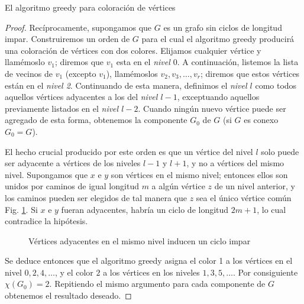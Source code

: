 \begin{section}{El algoritmo greedy para coloración de vértices}
\begin{proof}
Recíprocamente, supongamos que $G$ es un grafo sin ciclos de longitud impar. Construiremos un orden de $G$ para el cual el algoritmo greedy producirá una coloración de vértices con dos colores. Elijamos cualquier vértice y llamémoslo $v_1$; diremos que $v_1$ esta en el \textit{nivel $0$}. A continuación, listemos la
lista de vecinos de $v_1$ (excepto $v_1$), llamémoslos $v_2,v_3,\dots,v_r$; diremos que estos vértices están en el \textit{nivel 2}. Continuando de esta manera, definimos el \textit{nivel $l$} como todos aquellos vértices adyacentes a los del \textit{nivel $l-1$}, exceptuando aquellos previamente listados en el \textit{nivel
$l-2$}. Cuando ningún nuevo vértice puede ser agregado de esta forma, obtenemos la componente $G_0$ de $G$ (si $G$ es conexo $G_0=G$).

El hecho crucial producido por este orden es que un vértice del nivel $l$ solo puede ser adyacente a vértices de los niveles $l-1$ y $l+1$, y no a vértices del mismo nivel. Supongamos que $x$ e $y$ son vértices en el mismo nivel; entonces ellos son unidos por caminos de igual longitud $m$ a algún vértice $z$ de un nivel anterior, y los caminos pueden ser elegidos de tal manera que $z$ sea el único vértice común Fig. \ref{f5.13}. Si $x$ e $y$ fueran adyacentes, habría un ciclo de longitud $2m+1$, lo cual contradice
la hipótesis. 

\begin{figure}[ht]
    \begin{center}
    \end{center}
    \caption{Vértices adyacentes en el mismo nivel inducen un ciclo impar} \label{f5.13}
\end{figure}

Se deduce entonces que el algoritmo greedy asigna el color 1 a los vértices en el nivel $0,2,4,\ldots$, y el color $2$ a los vértices en los niveles $1,3,5,\ldots$. Por consiguiente $\chi(G_0)=2$. Repitiendo el mismo argumento para cada componente de $G$ obtenemos el resultado deseado.
\end{proof}


\end{section}
